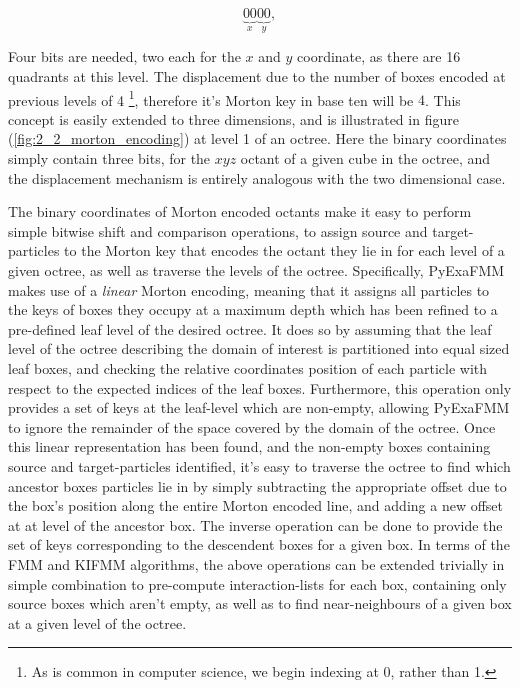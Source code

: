  \begin{equation}
    \underbrace{00}_{x}\underbrace{00}_{y},
\end{equation}

Four bits are needed, two each for the $x$ and $y$ coordinate, as there are 16
 quadrants at this level. The displacement due to the number of boxes encoded at
 previous levels of 4 \footnote{As is common in computer science, we begin indexing at 0, rather than 1.},
therefore it's Morton \gls{key} in base ten will be $4$. This concept is easily
extended to three dimensions, and is illustrated in
figure (\ref{fig:2_2_morton_encoding}) at level 1 of an octree. Here the binary
coordinates simply contain three bits, for the $xyz$ octant of a given cube
in the octree, and the displacement mechanism is entirely analogous with the
two dimensional case.

The binary coordinates of Morton encoded octants make it easy to perform simple
bitwise shift and comparison operations, to assign source and \gls{target-particles} to the Morton key
that encodes the octant they lie in for each level of a given octree, as well as traverse the levels of
the octree. Specifically, \gls{PyExaFMM} makes use of a \textit{linear} Morton encoding, meaning that it assigns
all particles to the keys of boxes they occupy at a maximum depth which has been refined to a
pre-defined leaf level of the desired octree. It does so by assuming that the
leaf level of the octree describing the domain of interest is partitioned into equal
sized leaf boxes, and checking the relative coordinates position of each particle
with respect to the expected indices of the leaf boxes. Furthermore, this operation only provides
a set of keys at the leaf-level which are non-empty, allowing \gls{PyExaFMM} to
ignore the remainder of the space covered by the domain of the octree. Once this
linear representation has been found, and the non-empty boxes containing
source and \gls{target-particles} identified, it's easy to traverse the octree
to find which ancestor boxes particles lie in by simply subtracting the appropriate
offset due to the box's position along the entire Morton encoded line, and adding a new offset at
at level of the ancestor box. The inverse operation can be done to provide the set
of keys corresponding to the descendent boxes for a given box. In terms of the
\gls{FMM} and \gls{KIFMM} algorithms, the above operations can be extended trivially
in simple combination to pre-compute \gls{interaction-list}s for each box, containing
only source boxes which aren't empty, as well as to find \gls{near-neighbours} of
a given box at a given level of the octree.

